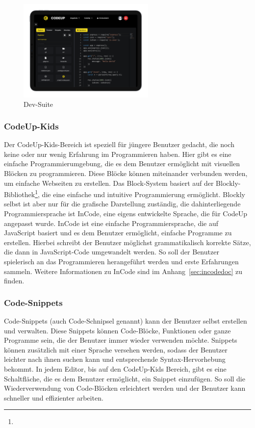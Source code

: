 \documentclass[main.tex]{subfiles}
\begin{document}
    \begin{figure}[h]
        \centering
        \includegraphics[width=0.6\textwidth]{assets/dev-suite}
        \caption{Dev-Suite}
        \label{fig:dev-suite}
    \end{figure}
    \subsubsection{CodeUp-Kids}
    Der CodeUp-Kids-Bereich ist speziell für jüngere Benutzer gedacht, die noch keine oder nur wenig Erfahrung im Programmieren haben.
    Hier gibt es eine einfache Programmierumgebung, die es dem Benutzer ermöglicht mit visuellen Blöcken zu programmieren.
    Diese Blöcke können miteinander verbunden werden, um einfache Webseiten zu erstellen.
    Das Block-System basiert auf der Blockly-Bibliothek\footnote{}, die eine einfache und intuitive Programmierung ermöglicht.
    Blockly selbst ist aber nur für die grafische Darstellung zuständig, die dahinterliegende Programmiersprache ist InCode, eine eigens entwickelte Sprache, die für CodeUp angepasst wurde.
    InCode ist eine einfache Programmiersprache, die auf JavaScript basiert und es dem Benutzer ermöglicht, einfache Programme zu erstellen.
    Hierbei schreibt der Benutzer möglichst grammatikalisch korrekte Sätze, die dann in JavaScript-Code umgewandelt werden.
    So soll der Benutzer spielerisch an das Programmieren herangeführt werden und erste Erfahrungen sammeln.
    Weitere Informationen zu InCode sind im Anhang~\ref{sec:incodedoc} zu finden.
    \subsubsection{Code-Snippets}
    Code-Snippets (auch Code-Schnipsel genannt) kann der Benutzer selbst erstellen und verwalten.
    Diese Snippets können Code-Blöcke, Funktionen oder ganze Programme sein, die der Benutzer immer wieder verwenden möchte.
    Snippets können zusätzlich mit einer Sprache versehen werden, sodass der Benutzer leichter nach ihnen suchen kann und entsprechende Syntax-Hervorhebung bekommt.
    In jedem Editor, bis auf den CodeUp-Kids Bereich, gibt es eine Schaltfläche, die es dem Benutzer ermöglicht, ein Snippet einzufügen.
    So soll die Wiederverwendung von Code-Blöcken erleichtert werden und der Benutzer kann schneller und effizienter arbeiten.
\end{document}
